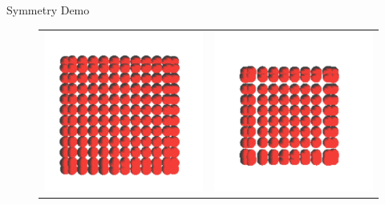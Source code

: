 \documentclass[red]{beamer}
\begin{document}
\begin{frame}{Symmetry Demo}
	\begin{figure}[htbp]
	\begin{center}
	\begin{tabular}{cc}
	\includegraphics[scale= 0.25]{../figures/coh1.pdf} &
	\includegraphics[scale= 0.25]{../figures/coh2.pdf} \\

\end{tabular}
\end{center}
\end{figure}
\end{frame}
\end{document}
